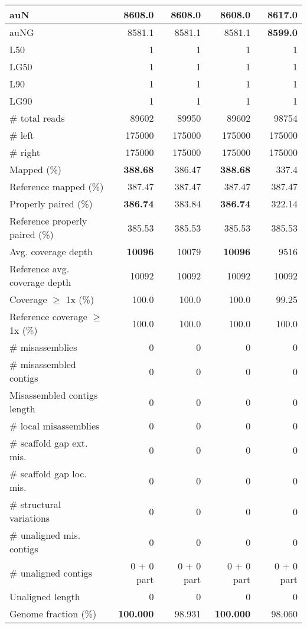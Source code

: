 \documentclass[12pt,a4paper]{article}
\begin{document}
\begin{table}[ht]
\begin{center}
\begin{tabular}{|l*{4}{|r}|}
auN & 8608.0 & 8608.0 & 8608.0 & {\bf 8617.0} \\ \hline
auNG & 8581.1 & 8581.1 & 8581.1 & {\bf 8599.0} \\ \hline
L50 & 1 & 1 & 1 & 1 \\ \hline
LG50 & 1 & 1 & 1 & 1 \\ \hline
L90 & 1 & 1 & 1 & 1 \\ \hline
LG90 & 1 & 1 & 1 & 1 \\ \hline
\# total reads & 89602 & 89950 & 89602 & 98754 \\ \hline
\# left & 175000 & 175000 & 175000 & 175000 \\ \hline
\# right & 175000 & 175000 & 175000 & 175000 \\ \hline
Mapped (\%) & {\bf 388.68} & 386.47 & {\bf 388.68} & 337.4 \\ \hline
Reference mapped (\%) & 387.47 & 387.47 & 387.47 & 387.47 \\ \hline
Properly paired (\%) & {\bf 386.74} & 383.84 & {\bf 386.74} & 322.14 \\ \hline
Reference properly paired (\%) & 385.53 & 385.53 & 385.53 & 385.53 \\ \hline
Avg. coverage depth & {\bf 10096} & 10079 & {\bf 10096} & 9516 \\ \hline
Reference avg. coverage depth & 10092 & 10092 & 10092 & 10092 \\ \hline
Coverage $\geq$ 1x (\%) & 100.0 & 100.0 & 100.0 & 99.25 \\ \hline
Reference coverage $\geq$ 1x (\%) & 100.0 & 100.0 & 100.0 & 100.0 \\ \hline
\# misassemblies & 0 & 0 & 0 & 0 \\ \hline
\# misassembled contigs & 0 & 0 & 0 & 0 \\ \hline
Misassembled contigs length & 0 & 0 & 0 & 0 \\ \hline
\# local misassemblies & 0 & 0 & 0 & 0 \\ \hline
\# scaffold gap ext. mis. & 0 & 0 & 0 & 0 \\ \hline
\# scaffold gap loc. mis. & 0 & 0 & 0 & 0 \\ \hline
\# structural variations & 0 & 0 & 0 & 0 \\ \hline
\# unaligned mis. contigs & 0 & 0 & 0 & 0 \\ \hline
\# unaligned contigs & 0 + 0 part & 0 + 0 part & 0 + 0 part & 0 + 0 part \\ \hline
Unaligned length & 0 & 0 & 0 & 0 \\ \hline
Genome fraction (\%) & {\bf 100.000} & 98.931 & {\bf 100.000} & 98.060 \\ \hline

\end{tabular}
\end{center}
\end{table}
\end{document}
